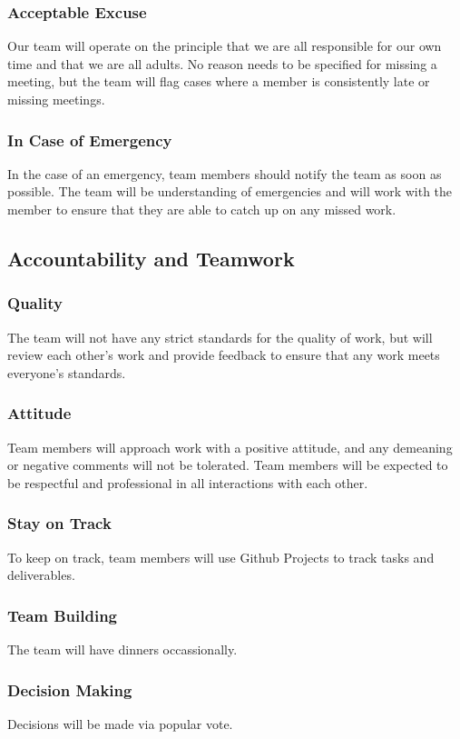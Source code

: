 \documentclass{article}
\begin{document}
\subsubsection*{Acceptable Excuse}

Our team will operate on the principle that we are all responsible for our own time and that we are all adults.
No reason needs to be specified for missing a meeting, but the team will flag cases where a member is consistently late or missing meetings.

\subsubsection*{In Case of Emergency}

In the case of an emergency, team members should notify the team as soon as possible. The team will be understanding of emergencies and will work with the member to ensure that they are able to catch up on any missed work.

\subsection*{Accountability and Teamwork}

\subsubsection*{Quality} 

The team will not have any strict standards for the quality of work, but will review each other's work and provide feedback to ensure that any work meets everyone's standards.

\subsubsection*{Attitude}

Team members will approach work with a positive attitude, and any demeaning or negative comments will not be tolerated. Team members will be expected to be respectful and professional in all interactions with each other.

\subsubsection*{Stay on Track}

To keep on track, team members will use Github Projects to track tasks and deliverables.

\subsubsection*{Team Building}

The team will have dinners occassionally.

\subsubsection*{Decision Making} 

Decisions will be made via popular vote.
\end{document}
